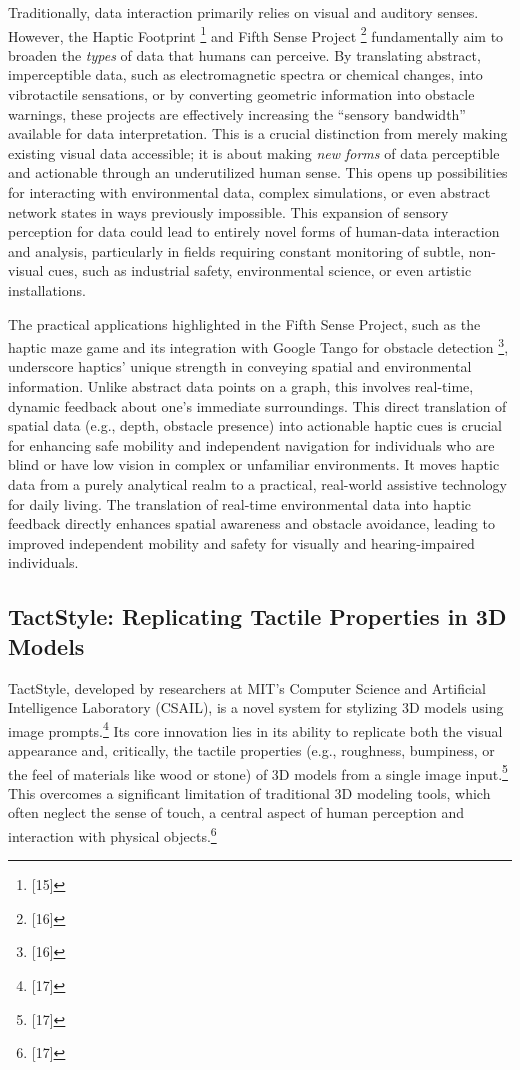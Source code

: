 Traditionally, data interaction primarily relies on visual and auditory senses. However, the Haptic Footprint \footnote{[15]} and Fifth Sense Project \footnote{[16]} fundamentally aim to broaden the \textit{types} of data that humans can perceive. By translating abstract, imperceptible data, such as electromagnetic spectra or chemical changes, into vibrotactile sensations, or by converting geometric information into obstacle warnings, these projects are effectively increasing the ``sensory bandwidth'' available for data interpretation. This is a crucial distinction from merely making existing visual data accessible; it is about making \textit{new forms} of data perceptible and actionable through an underutilized human sense. This opens up possibilities for interacting with environmental data, complex simulations, or even abstract network states in ways previously impossible. This expansion of sensory perception for data could lead to entirely novel forms of human-data interaction and analysis, particularly in fields requiring constant monitoring of subtle, non-visual cues, such as industrial safety, environmental science, or even artistic installations.

The practical applications highlighted in the Fifth Sense Project, such as the haptic maze game and its integration with Google Tango for obstacle detection \footnote{[16]}, underscore haptics' unique strength in conveying spatial and environmental information. Unlike abstract data points on a graph, this involves real-time, dynamic feedback about one's immediate surroundings. This direct translation of spatial data (e.g., depth, obstacle presence) into actionable haptic cues is crucial for enhancing safe mobility and independent navigation for individuals who are blind or have low vision in complex or unfamiliar environments. It moves haptic data from a purely analytical realm to a practical, real-world assistive technology for daily living. The translation of real-time environmental data into haptic feedback directly enhances spatial awareness and obstacle avoidance, leading to improved independent mobility and safety for visually and hearing-impaired individuals.

\subsection{TactStyle: Replicating Tactile Properties in 3D Models}
TactStyle, developed by researchers at MIT’s Computer Science and Artificial Intelligence Laboratory (CSAIL), is a novel system for stylizing 3D models using image prompts.\footnote{[17]} Its core innovation lies in its ability to replicate both the visual appearance and, critically, the tactile properties (e.g., roughness, bumpiness, or the feel of materials like wood or stone) of 3D models from a single image input.\footnote{[17]} This overcomes a significant limitation of traditional 3D modeling tools, which often neglect the sense of touch, a central aspect of human perception and interaction with physical objects.\footnote{[17]}

